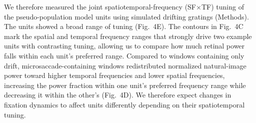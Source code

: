\documentclass{lite}
\begin{document}
We therefore measured the joint spatiotemporal-frequency (SF$\times$TF) tuning of the pseudo-population model units using simulated drifting gratings (Methods). The units showed a broad range of tuning (Fig.~4E). The contours in Fig.~4C mark the spatial and temporal frequency ranges that strongly drive two example units with contrasting tuning, allowing us to compare how much retinal power falls within each unit's preferred range. Compared to windows containing only drift, microsaccade-containing windows redistributed normalized natural-image power toward higher temporal frequencies and lower spatial frequencies, increasing the power fraction within one unit's preferred frequency range while decreasing it within the other's (Fig.~4D). We therefore expect changes in fixation dynamics to affect units differently depending on their spatiotemporal tuning.

\end{document}
